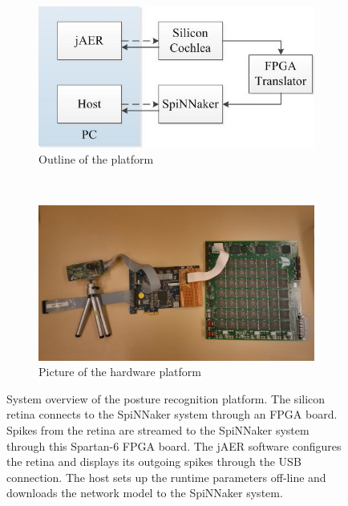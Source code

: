\documentclass[journal]{journal}
\begin{document}
\begin{figure}
\centering
	\begin{subfigure}[t]{0.42\textwidth}
		\includegraphics[width=\textwidth]{pics/outline.jpg}
	    \caption{Outline of the platform}
	    \label{fig:SysOverViewa}
	\end{subfigure}
	\\
	\begin{subfigure}[t]{0.42\textwidth}
		\includegraphics[width=\textwidth]{pics/outline1.jpg}	    \caption{Picture of the hardware platform}
	    \label{fig:SysOverViewb}
	\end{subfigure}	

\caption{System overview of the posture recognition platform. The silicon retina connects to the SpiNNaker system through an FPGA board. 
Spikes from the retina are streamed to the SpiNNaker system through this Spartan-6 FPGA board.
The jAER software configures the retina and displays its outgoing spikes through the USB connection.
The host sets up the runtime parameters off-line and downloads the network model to the SpiNNaker system.
}
\label{fig:SysOverView}
\end{figure}
\end{document}
